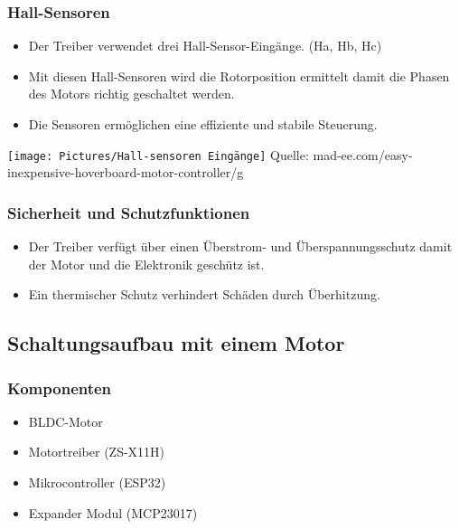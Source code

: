 \documentclass[ngerman,12pt,a4paper]{article}
\begin{document}
		\begin{minipage}{\textwidth}
		\subsubsection*{Hall-Sensoren}
		\begin{itemize}
			\item Der Treiber verwendet drei Hall-Sensor-Eingänge. (Ha, Hb, Hc)
			\item Mit diesen Hall-Sensoren wird die Rotorposition ermittelt damit die Phasen des Motors richtig geschaltet werden.
			\item Die Sensoren ermöglichen eine effiziente und stabile Steuerung.\\[0.5cm]
		\end{itemize}
		\end{minipage}
		
		\begin{minipage}{\textwidth}
			\centering
			\texttt{[image: Pictures/Hall-sensoren Eingänge]}
			\label{fig:spiffs_init}
			\vspace{-2pt}
			\small Quelle: mad-ee.com/easy-inexpensive-hoverboard-motor-controller/g
		\end{minipage}
		
		\subsubsection*{Sicherheit und Schutzfunktionen}
		\begin{itemize}
			\item Der Treiber verfügt über einen Überstrom- und Überspannungsschutz damit der Motor und die Elektronik geschütz ist.
			\item Ein thermischer Schutz verhindert Schäden durch Überhitzung.
		\end{itemize}
		\newpage
		\subsection{Schaltungsaufbau mit einem Motor} %
		
			\subsubsection{Komponenten}
			\begin{itemize}
				\item BLDC-Motor
				\item Motortreiber (ZS-X11H)
				\item Mikrocontroller (ESP32)
				\item Expander Modul (MCP23017)
			\end{itemize}
			
\end{document}
